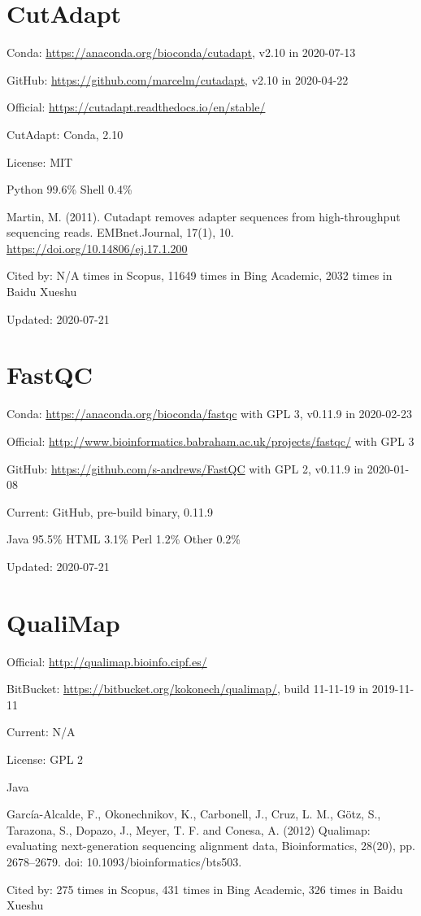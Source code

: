 \documentclass[]{article}
\newcommand{\cb}[3]{\par Cited by: {\color{blue}\Huge #1} times in Scopus, {\color{blue}\Huge #2} times in Bing Academic, {\color{blue}\Huge #3} times in Baidu Xueshu}
\begin{document}
\section{CutAdapt}

Conda: \url{https://anaconda.org/bioconda/cutadapt}, v2.10 in 2020-07-13

GitHub: \url{https://github.com/marcelm/cutadapt}, v2.10 in 2020-04-22

Official: \url{https://cutadapt.readthedocs.io/en/stable/}

CutAdapt: Conda, 2.10

License: MIT

Python 99.6\% Shell 0.4\%

Martin, M. (2011). Cutadapt removes adapter sequences from high-throughput sequencing reads. EMBnet.Journal, 17(1), 10. \url{https://doi.org/10.14806/ej.17.1.200} \cb{N/A}{11649}{2032}

Updated: 2020-07-21

\section{FastQC}

Conda: \url{https://anaconda.org/bioconda/fastqc} with GPL 3, v0.11.9 in 2020-02-23

Official: \url{http://www.bioinformatics.babraham.ac.uk/projects/fastqc/} with GPL 3

GitHub: \url{https://github.com/s-andrews/FastQC} with GPL 2, v0.11.9 in 2020-01-08

Current: GitHub, pre-build binary, 0.11.9

Java 95.5\% HTML 3.1\% Perl 1.2\% Other 0.2\%

Updated: 2020-07-21

\section{QualiMap}

Official: \url{http://qualimap.bioinfo.cipf.es/}

BitBucket: \url{https://bitbucket.org/kokonech/qualimap/}, build 11-11-19 in 2019-11-11

Current: N/A

License: GPL 2

Java

García-Alcalde, F., Okonechnikov, K., Carbonell, J., Cruz, L. M., Götz, S., Tarazona, S., Dopazo, J., Meyer, T. F. and Conesa, A. (2012) Qualimap: evaluating next-generation sequencing alignment data, Bioinformatics, 28(20), pp. 2678–2679. doi: 10.1093/bioinformatics/bts503.\cb{275}{431}{326}
\end{document}
